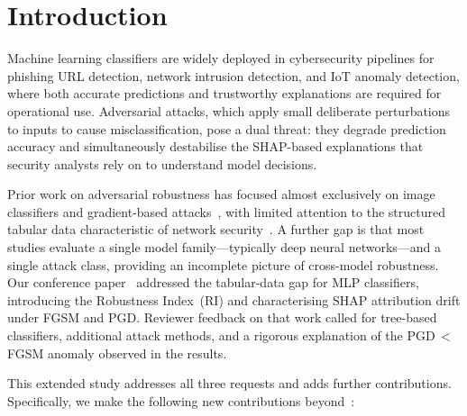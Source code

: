 \documentclass[runningheads]{llncs}
\begin{document}
\section{Introduction}
\label{sec:intro}

Machine learning classifiers are widely deployed in cybersecurity
pipelines for phishing URL detection, network intrusion detection, and IoT
anomaly detection, where both accurate predictions and trustworthy explanations
are required for operational use.  Adversarial attacks, which apply small deliberate
perturbations to inputs to cause misclassification, pose a dual threat: they
degrade prediction accuracy and simultaneously de\-sta\-bi\-lise the SHAP-based
explanations that security analysts rely on to understand model decisions.

Prior work on adversarial robustness has focused almost exclusively on image
classifiers and gradient-based attacks~\cite{goodfellow2015explaining,madry2018towards},
with limited attention to the structured tabular data characteristic of network
security~\cite{grosse2017adversarial,yang2020defending}.  A further gap is that
most studies evaluate a single model family---typically deep neural networks---and
a single attack class, providing an incomplete picture of cross-model robustness.
Our conference paper~\cite{khawarey2026empirical} addressed the tabular-data gap
for MLP classifiers, introducing the Robustness Index~(RI) and characterising
SHAP attribution drift under FGSM and PGD.  Reviewer feedback on that work called
for tree-based classifiers, additional attack methods, and a rigorous explanation
of the PGD\,$<$\,FGSM anomaly observed in the results.

This extended study addresses all three requests and adds further contributions.
Specifically, we make the following new contributions beyond~\cite{khawarey2026empirical}:
\end{document}
